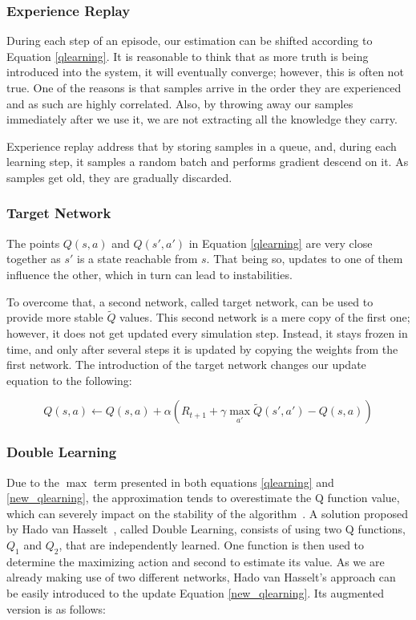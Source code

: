 \documentclass[11pt,twoside]{article}
\begin{document}
\subsubsection{Experience Replay}\label{experience}

During each step of an episode, our estimation can be shifted according to Equation \ref{qlearning}. It is reasonable to think that as more truth is being introduced into the system, it will eventually converge; however, this is often not true. One of the reasons is that samples arrive in the order they are experienced and as such are highly correlated. Also, by throwing away our samples immediately after we use it, we are not extracting all the knowledge they carry.

Experience replay address that by storing samples in a queue, and, during each learning step, it samples a random batch and performs gradient descend on it. As samples get old, they are gradually discarded.

\subsubsection{Target Network}

The points $Q(s, a)$ and $Q(s', a')$ in Equation \ref{qlearning} are very close together as $s'$ is a state reachable from $s$. That being so, updates to one of them influence the other, which in turn can lead to instabilities.

To overcome that, a second network, called target network, can be used to provide more stable $\widetilde{Q}$ values. This second network is a mere copy of the first one; however, it does not get updated every simulation step. Instead, it stays frozen in time, and only after several steps it is updated by copying the weights from the first network. The introduction of the target network changes our update equation to the following:

\begin{equation} \label{new_qlearning}
	Q(s, a) \leftarrow Q(s, a) + \alpha (R_{t+1} + \gamma \max_{a'}\widetilde{Q}(s', a') - Q(s,a))
\end{equation}

\subsubsection{Double Learning}\label{double_learning}

Due to the $\max$ term presented in both equations \ref{qlearning} and \ref{new_qlearning}, the approximation tends to overestimate the Q function value, which can severely impact on the stability of the algorithm~\cite{overestimation}. A solution proposed by Hado van Hasselt~\cite{doubleq2010}, called Double Learning, consists of using two Q functions, $Q_1$ and $Q_2$, that are independently learned. One function is then used to determine the maximizing action and second to estimate its value. As we are already making use of two different networks, Hado van Hasselt's approach can be easily introduced to the update Equation \ref{new_qlearning}. Its augmented version is as follows:
\end{document}
